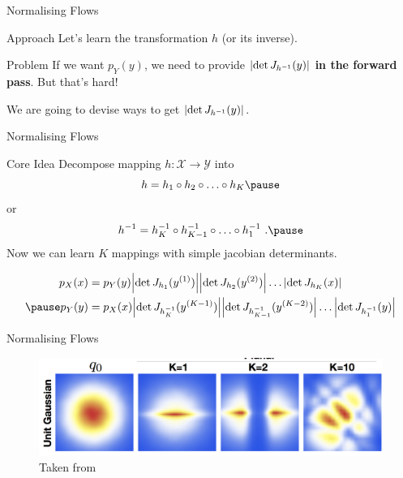 \begin{frame}{Normalising Flows}
\begin{block}{Approach}
Let's learn the transformation $ h $ (or its inverse).
\end{block}
\pause
\begin{block}{Problem}
If we want $ p_Y(y) $, we need to provide $ \abs{\det J_{h^{-1}}(y)} $ \textbf{in the forward pass}. \pause But that's hard! \pause
\end{block}
We are going to devise ways to get $ \abs{\det J_{h^{-1}}(y)} $.
\end{frame}

\begin{frame}{Normalising Flows}
\begin{block}{Core Idea}
Decompose mapping $ h: \mathcal{X} \rightarrow \mathcal{Y} $ into 
\begin{equation*}
h = h_{1}\circ h_{2}\circ\ldots\circ h_K  \pause
\end{equation*}
or
\begin{equation*}
h^{-1} = h_{K}^{-1}\circ h_{K-1}^{-1} \circ \ldots \circ h_{1}^{-1} ~ . \pause
\end{equation*}
Now we can learn $ K $ mappings with simple jacobian determinants.
\begin{small}
\pause
\begin{equation*}
\begin{aligned}
p_{X}(x) &= p_{Y}(y) \djac{h_{1}}{y^{(1)}}\djac{h_{2}}{y^{(2)}}\ldots \djac{h_{K}}{x} \\ \pause
p_{Y}(y) &= p_{X}(x)\djac{h_{K}^{-1}}{y^{(K-1)}} \djac{h_{K-1}^{-1}}{y^{(K-2)}}\ldots \djac{h_{1}^{-1}}{y}
\end{aligned}
\end{equation*}
\end{small}
\end{block}
\end{frame}

\begin{frame}{Normalising Flows}
\begin{figure}
\includegraphics[scale=.4]{nf.png}
\caption{Taken from \cite{RezendeMohamed:2015}}
\end{figure}
\end{frame}

